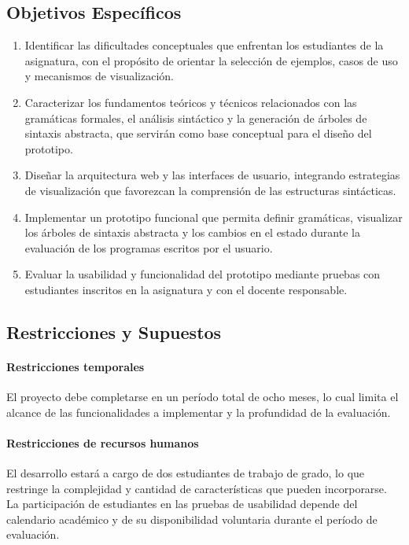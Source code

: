 \subsection{Objetivos Específicos}
\begin{enumerate}
\item Identificar las dificultades conceptuales que enfrentan los estudiantes de la asignatura, con el propósito de orientar la selección de ejemplos, casos de uso y mecanismos de visualización.
\item Caracterizar los fundamentos teóricos y técnicos relacionados con las gramáticas formales, el análisis sintáctico y la generación de árboles de sintaxis abstracta, que servirán como base conceptual para el diseño del prototipo.
\item Diseñar la arquitectura web y las interfaces de usuario, integrando estrategias de visualización que favorezcan la comprensión de las estructuras sintácticas.
\item Implementar un prototipo funcional que permita definir gramáticas, visualizar los árboles de sintaxis abstracta y los cambios en el estado durante la evaluación de los programas escritos por el usuario.
\item Evaluar la usabilidad y funcionalidad del prototipo mediante pruebas con estudiantes inscritos en la asignatura y con el docente responsable.
\end{enumerate}

\subsection{Restricciones y Supuestos}

\paragraph{Restricciones temporales}

El proyecto debe completarse en un período total de ocho meses, lo cual limita el alcance de las funcionalidades a implementar y la profundidad de la evaluación.

\paragraph{Restricciones de recursos humanos}

El desarrollo estará a cargo de dos estudiantes de trabajo de grado, lo que restringe la complejidad y cantidad de características que pueden incorporarse. La participación de estudiantes en las pruebas de usabilidad depende del calendario académico y de su disponibilidad voluntaria durante el período de evaluación.

